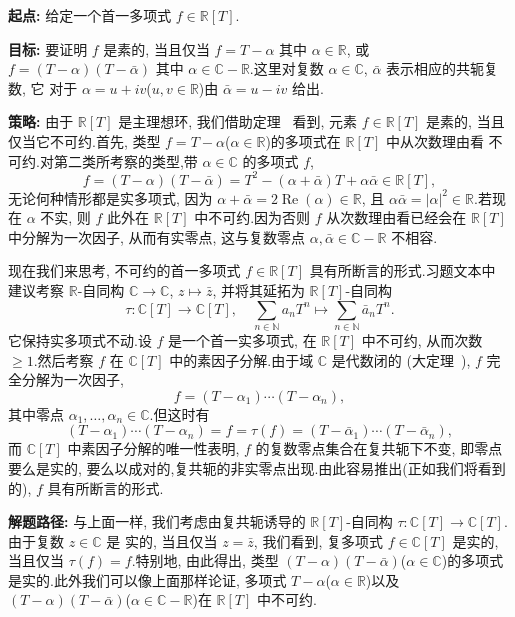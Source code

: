 \noindent\textbf{起点:} 给定一个首一多项式 $f \in \mathbb{R}[T]$.

\noindent\textbf{目标:} 要证明 $f$ 是素的, 当且仅当 $f = T - \alpha$ 其中 $\alpha \in
\mathbb{R}$, 或 $f = (T - \alpha)(T - \bar{\alpha})$ 其中 $\alpha \in \mathbb{C} -
\mathbb{R}$.这里对复数 $\alpha \in \mathbb{C}$, $\bar{\alpha}$ 表示相应的共轭复数, 它
对于 $\alpha = u + iv$($u, v \in \mathbb{R}$)由 $\bar{\alpha} = u - iv$ 给出.

\noindent\textbf{策略:} 由于 $\mathbb{R}[T]$ 是主理想环, 我们借助定理~
看到, 元素 $f \in \mathbb{R}[T]$ 是素的, 当且仅当它不可约.首先, 类型
$f = T - \alpha$($\alpha \in \mathbb{R}$)的多项式在 $\mathbb{R}[T]$ 中从次数理由看
不可约.对第二类所考察的类型,带 $\alpha \in \mathbb{C}$ 的多项式 $f$,
\[
f = (T - \alpha)(T - \bar{\alpha}) = T^2 - (\alpha + \bar{\alpha})T + \alpha \bar{\alpha} \in \mathbb{R}[T],
\]
无论何种情形都是实多项式, 因为 $\alpha + \bar{\alpha} = 2\operatorname{Re}(\alpha) \in
\mathbb{R}$, 且 $\alpha \bar{\alpha} = |\alpha|^2 \in \mathbb{R}$.若现在 $\alpha$ 不实,
则 $f$ 此外在 $\mathbb{R}[T]$ 中不可约.因为否则 $f$ 从次数理由看已经会在
$\mathbb{R}[T]$ 中分解为一次因子, 从而有实零点, 这与复数零点 $\alpha, \bar{\alpha} \in
\mathbb{C} - \mathbb{R}$ 不相容.

现在我们来思考, 不可约的首一多项式 $f \in \mathbb{R}[T]$ 具有所断言的形式.习题文本中
建议考察 $\mathbb{R}$-自同构 $\mathbb{C} \longrightarrow \mathbb{C}$, $z \longmapsto
\bar{z}$, 并将其延拓为 $\mathbb{R}[T]$-自同构
\[
\tau \colon \mathbb{C}[T] \longrightarrow \mathbb{C}[T], \quad \sum_{n \in \mathbb{N}} a_n T^n \longmapsto \sum_{n \in \mathbb{N}} \bar{a}_n T^n\text{.}
\]
它保持实多项式不动.设 $f$ 是一个首一实多项式, 在 $\mathbb{R}[T]$ 中不可约, 从而次数
$\geq 1$.然后考察 $f$ 在 $\mathbb{C}[T]$ 中的素因子分解.由于域 $\mathbb{C}$ 是代数闭的
(大定理~), $f$ 完全分解为一次因子,
\[
f = (T - \alpha_1) \cdots (T - \alpha_n),
\]
其中零点 $\alpha_1, \ldots, \alpha_n \in \mathbb{C}$.但这时有
\[
(T - \alpha_1) \cdots (T - \alpha_n) = f = \tau(f) = (T - \bar{\alpha}_1) \cdots (T - \bar{\alpha}_n),
\]
而 $\mathbb{C}[T]$ 中素因子分解的唯一性表明, $f$ 的复数零点集合在复共轭下不变, 即零点
要么是实的, 要么以成对的,复共轭的非实零点出现.由此容易推出(正如我们将看到的),
$f$ 具有所断言的形式.

\noindent\textbf{解题路径:} 与上面一样, 我们考虑由复共轭诱导的 $\mathbb{R}[T]$-自同构
$\tau \colon \mathbb{C}[T] \longrightarrow \mathbb{C}[T]$.由于复数 $z \in \mathbb{C}$ 是
实的, 当且仅当 $z = \bar{z}$, 我们看到, 复多项式 $f \in \mathbb{C}[T]$ 是实的, 当且仅当
$\tau(f) = f$.特别地, 由此得出, 类型 $(T - \alpha)(T - \bar{\alpha})$($\alpha \in
\mathbb{C}$)的多项式是实的.此外我们可以像上面那样论证, 多项式 $T - \alpha$($\alpha \in
\mathbb{R}$)以及 $(T - \alpha)(T - \bar{\alpha})$($\alpha \in \mathbb{C} - \mathbb{R}$)在
$\mathbb{R}[T]$ 中不可约.

